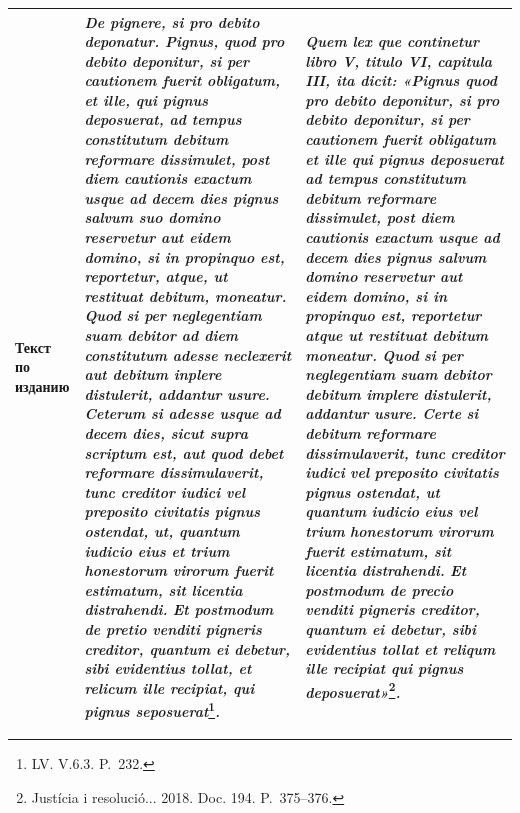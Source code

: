 \begin{center}
\begin{longtable}{|p{}|p{}|p{}|}
\textbf{Текст по изданию} & \emph{De pignere, si pro debito deponatur. Pignus, quod pro debito deponitur, si per cautionem fuerit obligatum, et ille, qui pignus deposuerat, ad tempus constitutum debitum reformare dissimulet, post diem cautionis exactum usque ad decem dies pignus salvum suo domino reservetur aut eidem domino, si in propinquo est, reportetur, atque, ut restituat debitum, moneatur. Quod si per neglegentiam suam debitor ad diem constitutum adesse neclexerit aut debitum inplere distulerit, addantur }\emph{usure. Ceterum si adesse usque ad decem dies, sicut supra scriptum est, aut quod debet reformare dissimulaverit, tunc creditor iudici vel preposito civitatis pignus ostendat, ut, quantum iudicio eius et trium honestorum virorum fuerit estimatum, sit licentia distrahendi. }\emph{Et postmodum de pretio venditi pigneris creditor, quantum ei debetur, sibi evidentius tollat, et relicum ille recipiat, qui pignus seposuerat}\footnote{LV. V.6.3. P.~232.}\emph{.} & \emph{Quem lex que continetur libro V, titulo VI, capitula III, ita dicit: «Pignus quod pro debito deponitur, si pro debito deponitur, si per cautionem fuerit obligatum et ille qui pignus deposuerat ad tempus constitutum debitum reformare dissimulet, post diem cautionis exactum usque ad decem dies pignus salvum domino reservetur aut eidem domino, si in propinquo est, reportetur atque ut restituat debitum moneatur. }\emph{Quod}\emph{ }\emph{si}\emph{ per }\emph{neglegentiam}\emph{ }\emph{suam}\emph{ }\emph{debitor}\emph{ }\emph{debitum}\emph{ }\emph{implere}\emph{ }\emph{distulerit}\emph{, }\emph{addantur}\emph{ usure. }\emph{Certe}\emph{ }\emph{si}\emph{ }\emph{debitum}\emph{ }\emph{reformare}\emph{ }\emph{dissimulaverit}\emph{, tunc }\emph{creditor }\emph{iudici}\emph{ vel }\emph{preposito}\emph{ civitatis pignus }\emph{ostendat}\emph{, ut quantum }\emph{iudicio}\emph{ eius vel }\emph{trium}\emph{ }\emph{honestorum}\emph{ }\emph{virorum}\emph{ }\emph{fuerit}\emph{ }\emph{estimatum}\emph{, sit }\emph{licentia}\emph{ }\emph{distrahendi}\emph{. }\emph{Et postmodum de precio venditi pigneris creditor, quantum ei debetur, sibi evidentius tollat et reliqum ille recipiat qui pignus deposuerat»}\footnote{Justícia i resolució... 2018. Doc. 194. P.~375--376.}\emph{.} \\ \hline

\end{longtable}
\end{center}
